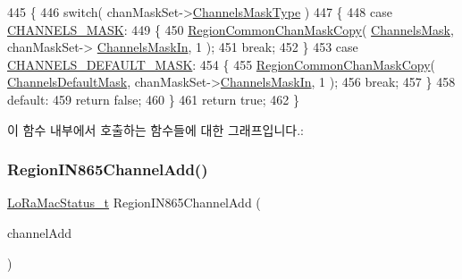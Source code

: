 \begin{DoxyCode}
445 \{
446     \textcolor{keywordflow}{switch}( chanMaskSet->\mbox{\hyperlink{structs_chan_mask_set_params_a02b75be74cbc34fa2126b2c250ea9283}{ChannelsMaskType}} )
447     \{
448         \textcolor{keywordflow}{case} \mbox{\hyperlink{group___r_e_g_i_o_n_gga7a62e669f567fc160ad58210664bca9ca1e68275c0b16a0c4935eada4315dd089}{CHANNELS\_MASK}}:
449         \{
450             \mbox{\hyperlink{group___r_e_g_i_o_n_c_o_m_m_o_n_ga95f5199d490113269fae7f2e0569e9a0}{RegionCommonChanMaskCopy}}( \mbox{\hyperlink{_region_i_n865_8c_a2188957b5ca6af8092154d7ccbfa5757}{ChannelsMask}}, chanMaskSet->
      \mbox{\hyperlink{structs_chan_mask_set_params_ade387d6ecaf27781b14ad97ebdfc0695}{ChannelsMaskIn}}, 1 );
451             \textcolor{keywordflow}{break};
452         \}
453         \textcolor{keywordflow}{case} \mbox{\hyperlink{group___r_e_g_i_o_n_gga7a62e669f567fc160ad58210664bca9ca9bbb18c8600ad8781ba04a2cb121ea60}{CHANNELS\_DEFAULT\_MASK}}:
454         \{
455             \mbox{\hyperlink{group___r_e_g_i_o_n_c_o_m_m_o_n_ga95f5199d490113269fae7f2e0569e9a0}{RegionCommonChanMaskCopy}}( 
      \mbox{\hyperlink{_region_i_n865_8c_ac127b19779301713d5ed92eb03366a2d}{ChannelsDefaultMask}}, chanMaskSet->\mbox{\hyperlink{structs_chan_mask_set_params_ade387d6ecaf27781b14ad97ebdfc0695}{ChannelsMaskIn}}, 1 );
456             \textcolor{keywordflow}{break};
457         \}
458         \textcolor{keywordflow}{default}:
459             \textcolor{keywordflow}{return} \textcolor{keyword}{false};
460     \}
461     \textcolor{keywordflow}{return} \textcolor{keyword}{true};
462 \}
\end{DoxyCode}
이 함수 내부에서 호출하는 함수들에 대한 그래프입니다.\+:
\mbox{\label{group___r_e_g_i_o_n_i_n865_ga409780ea153146450bde780493f00b1b}} 
\subsubsection{\texorpdfstring{Region\+I\+N865\+Channel\+Add()}{RegionIN865ChannelAdd()}}
{\footnotesize\ttfamily \mbox{\hyperlink{group___l_o_r_a_m_a_c_ga30bd25657e10480f8605ee951b0ecfbd}{Lo\+Ra\+Mac\+Status\+\_\+t}} Region\+I\+N865\+Channel\+Add (\begin{DoxyParamCaption}\item[{\mbox{\hyperlink{group___r_e_g_i_o_n_gab1c5f3aa06614283202906cef4417860}{Channel\+Add\+Params\+\_\+t}} $\ast$}]{channel\+Add }\end{DoxyParamCaption})}




